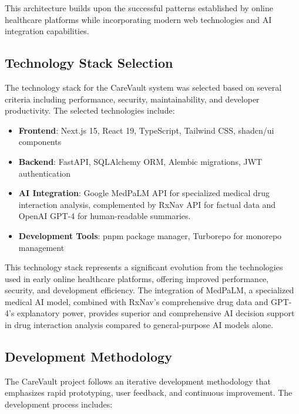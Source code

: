 \documentclass[12pt,a4paper]{article}
\begin{document}
This architecture builds upon the successful patterns established by online healthcare platforms while incorporating modern web technologies and AI integration capabilities.

\subsection{Technology Stack Selection}

The technology stack for the CareVault system was selected based on several criteria including performance, security, maintainability, and developer productivity. The selected technologies include:

\begin{itemize}
    \item \textbf{Frontend}: Next.js 15, React 19, TypeScript, Tailwind CSS, shadcn/ui components
    \item \textbf{Backend}: FastAPI, SQLAlchemy ORM, Alembic migrations, JWT authentication
    \item \textbf{AI Integration}: Google MedPaLM API for specialized medical drug interaction analysis, complemented by RxNav API for factual data and OpenAI GPT-4 for human-readable summaries.
    \item \textbf{Development Tools}: pnpm package manager, Turborepo for monorepo management
\end{itemize}

This technology stack represents a significant evolution from the technologies used in early online healthcare platforms, offering improved performance, security, and development efficiency. The integration of MedPaLM, a specialized medical AI model, combined with RxNav's comprehensive drug data and GPT-4's explanatory power, provides superior and comprehensive AI decision support in drug interaction analysis compared to general-purpose AI models alone.

\subsection{Development Methodology}

The CareVault project follows an iterative development methodology that emphasizes rapid prototyping, user feedback, and continuous improvement. The development process includes:
\end{document}
